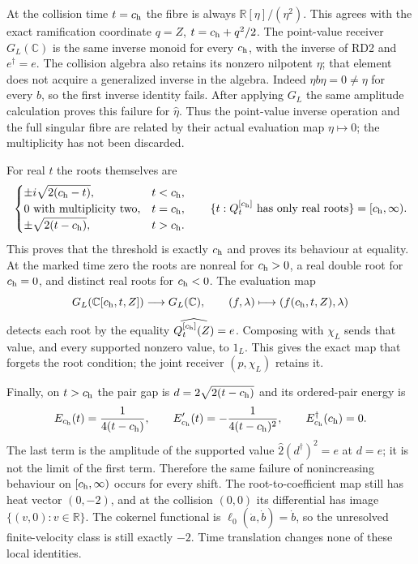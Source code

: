 \documentclass[11pt,a4paper]{article}
\theoremstyle{definition}\newtheorem{definition}[theorem]{Definition}
\begin{document}
At the collision time $t=c_{\rm h}$ the fibre is always
$\mathbb R[\eta]/(\eta^2)$. This agrees with the exact
ramification coordinate $q=Z$, $t=c_{\rm h}+q^2/2$. The
point-value receiver $G_L(\mathbb C)$ is the same inverse monoid
for every $c_{\rm h}$, with the inverse of RD2 and $e^\dagger=e$.
The collision algebra also retains its nonzero nilpotent $\eta$;
that element does not acquire a generalized inverse in the
algebra. Indeed $\eta b\eta=0\ne\eta$ for every $b$, so the
first inverse identity fails. After applying $G_L$ the same
amplitude calculation proves this failure for $\widehat\eta$.
Thus the point-value inverse operation and the full singular fibre
are related by their actual evaluation map $\eta\mapsto0$;
the multiplicity has not been discarded.

For real $t$ the roots themselves are
\begin{equation}
 \begin{cases}
  \displaystyle\pm i\sqrt{2(c_{\rm h}-t)},&t<c_{\rm h},\\
  0\text{ with multiplicity two},&t=c_{\rm h},\\
  \displaystyle\pm\sqrt{2(t-c_{\rm h})},&t>c_{\rm h}.
 \end{cases}
 \qquad
 \{t:Q_t^{[c_{\rm h}]}\text{ has only real roots}\}
       =[c_{\rm h},\infty).
 \label{eq:rd-shifted-threshold}
\end{equation}
This proves that the threshold is exactly $c_{\rm h}$ and proves
its behaviour at equality. At the marked time zero the roots are
nonreal for $c_{\rm h}>0$, a real double root for $c_{\rm h}=0$,
and distinct real roots for $c_{\rm h}<0$. The evaluation map
\[
 G_L(\mathbb C[c_{\rm h},t,Z])\longrightarrow G_L(\mathbb C),
 \qquad(f,\lambda)\longmapsto
       (f(c_{\rm h},t,Z),\lambda)
\]
detects each root by the equality
$\widehat{Q_t^{[c_{\rm h}]}(Z)}=e$. Composing with $\chi_L$
sends that value, and every supported nonzero value, to $1_L$.
This gives the exact map that forgets the root condition; the joint
receiver $(p,\chi_L)$ retains it.

Finally, on $t>c_{\rm h}$ the pair gap is
$d=2\sqrt{2(t-c_{\rm h})}$ and its ordered-pair energy is
\begin{equation}
 E_{c_{\rm h}}(t)=\frac1{4(t-c_{\rm h})},\qquad
 E_{c_{\rm h}}'(t)=-\frac1{4(t-c_{\rm h})^2},\qquad
 E_{c_{\rm h}}^\dagger(c_{\rm h})=0.
 \label{eq:rd-shifted-energy}
\end{equation}
The last term is the amplitude of the supported value
$\widehat2(d^\dagger)^2=e$ at $d=e$; it is not the limit of the
first term. Therefore the same failure of nonincreasing behaviour
on $[c_{\rm h},\infty)$ occurs for every shift. The root-to-coefficient
map still has heat vector $(0,-2)$, and at the collision $(0,0)$
its differential has image $\{(v,0):v\in\mathbb R\}$.
The cokernel functional is $\ell_0(\dot a,\dot b)=\dot b$, so
the unresolved finite-velocity class is still exactly $-2$.
Time translation changes none of these local identities.
\end{document}
